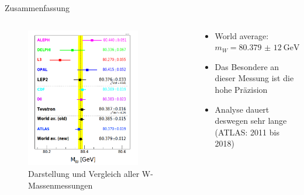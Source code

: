 \documentclass[aspectratio=1610, 9pt]{beamer}
\begin{document}
\begin{frame}{Zusammenfassung}
  \begin{columns}
    \begin{column}{0.4\textwidth}
      \begin{figure}
        \includegraphics[width=0.8\textwidth]{images/comparison2.png}
        \caption{Darstellung und Vergleich aller W-Massenmessungen \cite{comparison2}}
      \end{figure}
    \end{column}
    \begin{column}{0.4\textwidth}
      \begin{itemize}
        \item World average: $m_W = \SI{80,379(12)}{\GeV}$
        \item Das Besondere an dieser Messung ist die hohe Präzision
        \item Analyse dauert deswegen sehr lange (ATLAS: 2011 bis 2018)
      \end{itemize}
    \end{column}
  \end{columns}
\end{frame}

\end{document}
